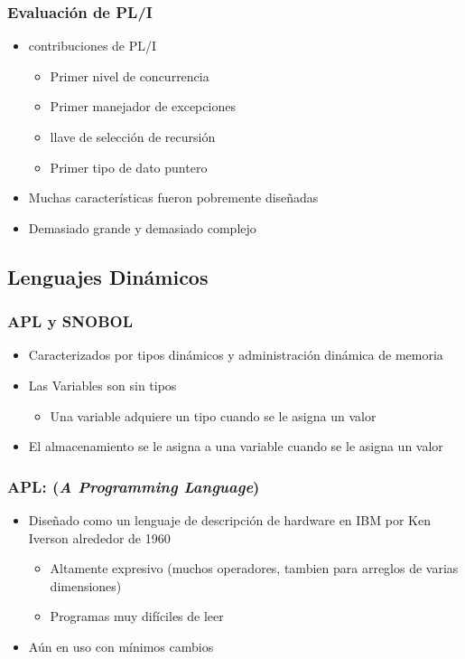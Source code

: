 \documentclass[11pt]{article}
\begin{document}
\subsubsection*{Evaluación de PL/I}
\label{sec:orgheadline74}
\begin{itemize}
\item contribuciones de PL/I
\begin{itemize}
\item Primer nivel de concurrencia
\item Primer manejador de excepciones
\item llave de selección de recursión
\item Primer tipo de dato puntero
\end{itemize}
\item Muchas características fueron pobremente diseñadas
\item Demasiado grande y demasiado complejo
\end{itemize}

\subsection*{Lenguajes Dinámicos}
\label{sec:orgheadline79}

\subsubsection*{APL y SNOBOL}
\label{sec:orgheadline76}
\begin{itemize}
\item Caracterizados por tipos dinámicos y administración dinámica de memoria
\item Las Variables son sin tipos
\begin{itemize}
\item Una variable adquiere un tipo cuando se le asigna un valor
\end{itemize}
\item El almacenamiento se le asigna a una variable cuando se le asigna un valor
\end{itemize}

\subsubsection*{APL: (\emph{A Programming Language})}
\label{sec:orgheadline77}
\begin{itemize}
\item Diseñado como un lenguaje de descripción de hardware en IBM por Ken
Iverson alrededor de 1960
\begin{itemize}
\item Altamente expresivo (muchos operadores, tambien para arreglos de
varias dimensiones)
\item Programas muy difíciles de leer
\end{itemize}
\item Aún en uso con mínimos cambios
\end{itemize}
\end{document}
